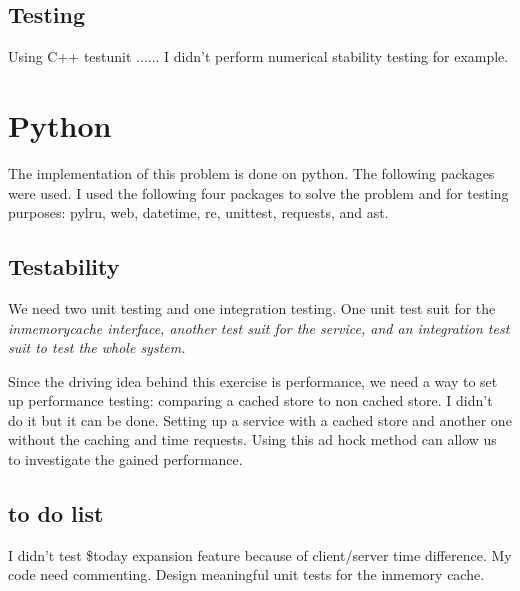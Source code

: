 \documentclass[12pt]{article}
\begin{document}
  
  \subsection {Testing}
  Using C++ testunit ......
  I didn't perform  numerical stability testing for example.
  
  \section{Python}
  The implementation of this problem is done on python.  The following packages were used.
  I used the following four packages to solve the problem and for testing purposes: {pylru, web, datetime, re, unittest, requests, and ast}. 
  
  \subsection{Testability}
  We need two unit testing and one integration testing.  One unit test suit for the \it{inmemorycache} interface, another test suit for the service, and an integration test suit to test the whole system.
  
  Since the driving idea behind this exercise is performance, we need a way to set up performance testing:  comparing a cached store to non cached store.  I didn't do it but it can be done. 
  Setting up a service with a cached store and another one without the caching and time requests.  Using this ad hock method can allow us to investigate the gained performance.
    
  \subsection{to do list}
   I didn't test \${today} expansion feature because of client/server time difference. 
   My code need commenting.  Design meaningful unit tests for the inmemory cache.
  
  
  
  
\end{document}
